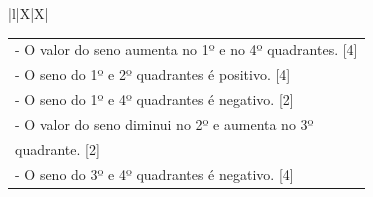 \begin{xltabular}{\textwidth}{|l|X|X|}
{\begin{tabular}[c]{@{}l@{}}

	\\- O valor do seno aumenta no 1º e no 4º quadrantes. [4] 
	\\- O seno do 1º e 2º quadrantes é positivo. [4]
	\\- O seno do 1º e 4º quadrantes é negativo. [2]
	\\- O valor do seno diminui no 2º e aumenta no 3º \\quadrante. [2]
	\\- O seno do 3º e 4º quadrantes é negativo. [4]
			
\end{tabular} }\\ \hline
	 \\ \hline
	 \\ \hline
	 \\ \hline
	 \\ \hline
	\\ \hline



\end{xltabular}

